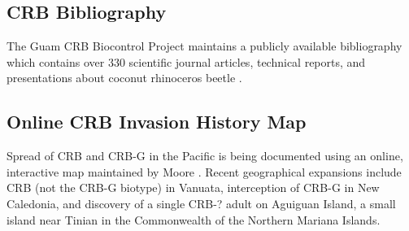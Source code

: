 \documentclass[12pt,letterpaper,english,bibliography=totocnumbered]{scrartcl}
\begin{document}
\subsection{CRB Bibliography}

The Guam CRB Biocontrol Project maintains a publicly available bibliography which contains over 330 scientific journal articles, technical reports, and presentations about coconut rhinoceros beetle \cite{moore_coconut_2019}.

\subsection{Online CRB Invasion History Map}

Spread of CRB and CRB-G in the Pacific is being documented using an online, interactive map maintained by Moore \cite{moore_web_2019}. Recent geographical expansions include CRB (not the CRB-G biotype) in Vanuata, interception of CRB-G in New Caledonia, and discovery of a single CRB-? adult on Aguiguan Island, a small island near Tinian in the Commonwealth of the Northern Mariana Islands.

\newpage
\printbibliography
\end{document}
